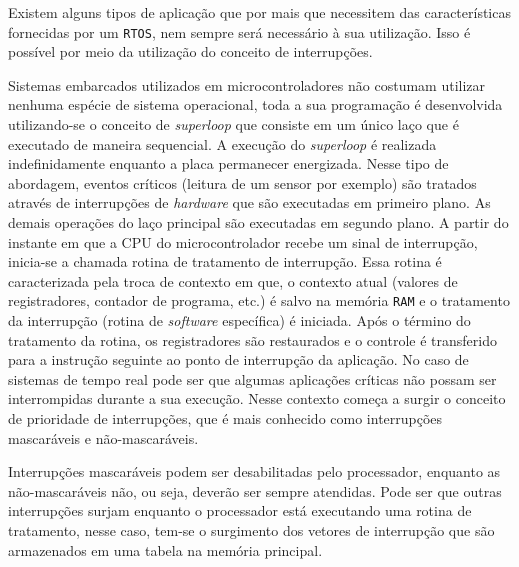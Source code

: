 Existem alguns tipos de aplicação que por mais que necessitem das características fornecidas por um \texttt{RTOS}, nem sempre será necessário à sua utilização. Isso é possível por meio da utilização do conceito de interrupções.
 
Sistemas embarcados utilizados em microcontroladores não costumam utilizar nenhuma espécie de sistema operacional, toda a sua programação é desenvolvida utilizando-se o conceito de \textit{superloop} que consiste em um único laço que é executado de maneira sequencial. A execução do \textit{superloop} é realizada indefinidamente enquanto a placa permanecer energizada. Nesse tipo de abordagem, eventos críticos (leitura de um sensor por exemplo) são tratados através de interrupções de \textit{hardware} que são executadas em primeiro plano. As demais operações do laço principal são executadas em segundo plano. A partir do instante em que a CPU do microcontrolador recebe um sinal de interrupção, inicia-se a chamada rotina de tratamento de interrupção. Essa rotina é caracterizada pela troca de contexto em que, o contexto atual (valores de registradores, contador de programa, etc.) é salvo na memória \texttt{RAM} e o tratamento da interrupção (rotina de \textit{software} específica) é iniciada. Após o término do tratamento da rotina, os registradores são restaurados e o controle é transferido para a instrução seguinte ao ponto de interrupção da aplicação. No caso de sistemas de tempo real pode ser que algumas aplicações críticas não possam ser interrompidas durante a sua execução. Nesse contexto começa a surgir o conceito de prioridade de interrupções, que é mais conhecido como interrupções mascaráveis e não-mascaráveis.

Interrupções mascaráveis podem ser desabilitadas pelo processador, enquanto as não-mascaráveis não, ou seja, deverão ser sempre atendidas. Pode ser que outras interrupções surjam enquanto o processador está executando uma rotina de tratamento, nesse caso, tem-se o surgimento dos vetores de interrupção que são armazenados em uma tabela na memória principal.

